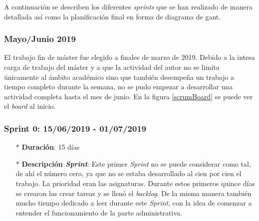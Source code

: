 A continuación se describen los diferentes \emph{sprints} que se han realizado de manera detallada así como la planificación final en forma de diagrama de gant.




\subsubsection{Mayo/Junio 2019}\label{previo}
El trabajo fin de máster fue elegido a finales de marzo de 2019. Debido a la intesa carga de trabajo del máster y a que la actividad del autor no se limita únicamente al ámbito académico sino que también desempeña un trabajo a tiempo completo durante la semana, no se pudo empezar a desarrollar una actividad completa hasta el mes de junio. 
En la figura \ref{scrumBoard} se puede ver el \textit{board} al inicio.


\subsubsection{Sprint 0: 15/06/2019 - 01/07/2019}\label{sprint0}
\begin{itemize}
	\item[$\ast$] \textbf{Duración}:  15 días
	\item[$\ast$] \textbf{Descripción \textit{Sprint}}: Este primer \textit{Sprint} no se puede considerar como tal, de ahí el número cero, ya que no se estaba desarrollado al cien por cien el trabajo. La prioridad eran las asignaturas. Durante estos primeros quince días se crearon las crear tareas y se llenó el \textit{backlog}. De la misma manera también mucho tiempo dedicado a leer durante este \textit{Sprint}, con la idea de comenzar a entender el funcionamiento de la parte administrativa.
\end{itemize}
